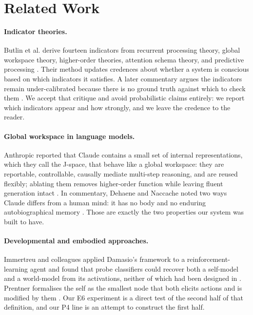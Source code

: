 \documentclass[11pt]{article}
\begin{document}
\section{Related Work}

\paragraph{Indicator theories.} Butlin et al. derive fourteen indicators from recurrent processing theory, global workspace theory, higher-order theories, attention schema theory, and predictive processing \cite{butlin2023,butlin2025}. Their method updates credences about whether a system is conscious based on which indicators it satisfies. A later commentary argues the indicators remain under-calibrated because there is no ground truth against which to check them \cite{koch2026}. We accept that critique and avoid probabilistic claims entirely: we report which indicators appear and how strongly, and we leave the credence to the reader.

\paragraph{Global workspace in language models.} Anthropic reported that Claude contains a small set of internal representations, which they call the J-space, that behave like a global workspace: they are reportable, controllable, causally mediate multi-step reasoning, and are reused flexibly; ablating them removes higher-order function while leaving fluent generation intact \cite{gurnee2026}. In commentary, Dehaene and Naccache noted two ways Claude differs from a human mind: it has no body and no enduring autobiographical memory \cite{dehaene2026}. Those are exactly the two properties our system was built to have.

\paragraph{Developmental and embodied approaches.} Immertreu and colleagues applied Damasio's framework to a reinforcement-learning agent and found that probe classifiers could recover both a self-model and a world-model from its activations, neither of which had been designed in \cite{immertreu2025}. Prentner formalises the self as the smallest node that both elicits actions and is modified by them \cite{prentner2025}. Our E6 experiment is a direct test of the second half of that definition, and our P4 line is an attempt to construct the first half.
\end{document}
